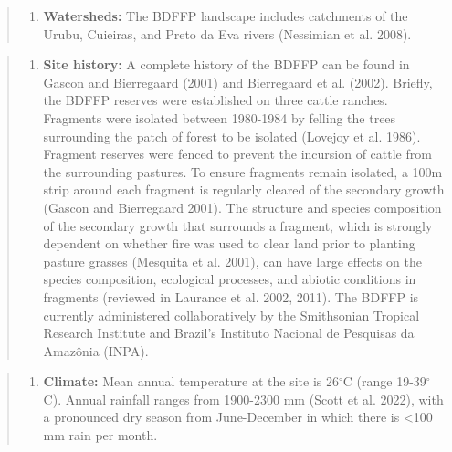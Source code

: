 \documentclass[
  12pt,
  man, donotrepeattitle,floatsintext]{apa6}
\providecommand{\tightlist}{%
  \setlength{\itemsep}{0pt}\setlength{\parskip}{0pt}}
\begin{document}
\begin{quote}
\begin{enumerate}
\def\labelenumi{\alph{enumi}.}
\setcounter{enumi}{4}
\tightlist
\item
  \textbf{Watersheds:} The BDFFP landscape includes catchments of the Urubu, Cuieiras, and Preto da Eva rivers (Nessimian et al. 2008).
\end{enumerate}
\end{quote}

\begin{quote}
\begin{enumerate}
\def\labelenumi{\alph{enumi}.}
\setcounter{enumi}{5}
\tightlist
\item
  \textbf{Site history:} A complete history of the BDFFP can be found in Gascon and Bierregaard (2001) and Bierregaard et al. (2002). Briefly, the BDFFP reserves were established on three cattle ranches. Fragments were isolated between 1980-1984 by felling the trees surrounding the patch of forest to be isolated (Lovejoy et al. 1986). Fragment reserves were fenced to prevent the incursion of cattle from the surrounding pastures. To ensure fragments remain isolated, a 100m strip around each fragment is regularly cleared of the secondary growth (Gascon and Bierregaard 2001). The structure and species composition of the secondary growth that surrounds a fragment, which is strongly dependent on whether fire was used to clear land prior to planting pasture grasses (Mesquita et al. 2001), can have large effects on the species composition, ecological processes, and abiotic conditions in fragments (reviewed in Laurance et al. 2002, 2011). The BDFFP is currently administered collaboratively by the Smithsonian Tropical Research Institute and Brazil's Instituto Nacional de Pesquisas da Amazônia (INPA).
\end{enumerate}
\end{quote}

\begin{quote}
\begin{enumerate}
\def\labelenumi{\alph{enumi}.}
\setcounter{enumi}{6}
\tightlist
\item
  \textbf{Climate:} Mean annual temperature at the site is 26\(^\circ\)C (range 19-39\(^\circ\)C). Annual rainfall ranges from 1900-2300 mm (Scott et al. 2022), with a pronounced dry season from June-December in which there is \textless100 mm rain per month.
\end{enumerate}
\end{quote}
\end{document}
